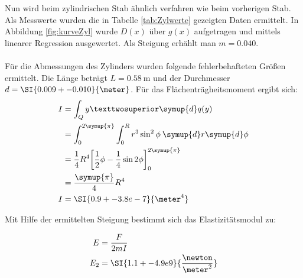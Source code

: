 Nun wird beim zylindrischen Stab ähnlich verfahren wie beim vorherigen Stab.
Als Messwerte wurden die in Tabelle \ref{tab:Zylwerte} gezeigten Daten ermittelt.
In Abbildung \ref{fig:kurveZyl} wurde $D(x)$ über $g(x)$ aufgetragen und mittels linearer Regression ausgewertet. Als Steigung erhählt man $m=\num{0.040}$.
\\
\\
Für die Abmessungen des Zylinders wurden folgende fehlerbehafteten Größen ermittelt.
Die Länge beträgt $L=\SI{0.58}{\meter}$ und der Durchmesser $d=\SI{0.009+-0.010}{\meter}$.
Für das Flächenträgheitsmoment ergibt sich:
\begin{align*}
    I &= \int_Q y² \symup{d}q(y) \\
      &= \int_0^{2\symup{\pi}} \int_0^R r^3\sin^2\phi \: \symup{d}r\symup{d}\phi \\
      &= \frac{1}{4}R^4 \biggl[\frac{1}{2}\phi-\frac{1}{4}\sin2\phi\biggr]_0^{2\symup{\pi}} \\
      &= \frac{\symup{\pi}}{4}R^4 \\
    I &= \SI{0.9+-3.8e-7}{\meter^4} \\
\end{align*}

Mit Hilfe der ermittelten Steigung bestimmt sich das Elastizitätsmodul zu:

\begin{align*}
    E   &= \frac{F}{2mI} \\
    E_2 &= \SI{1.1+-4.9e9}{\frac{\newton}{\meter^2}} \\
\end{align*}

